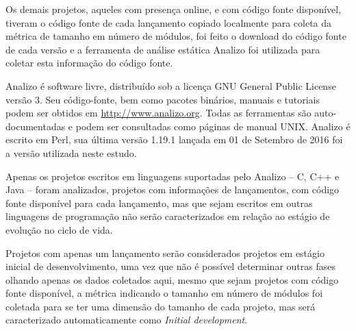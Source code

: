 
Os demais projetos, aqueles com presença online, e com código fonte disponível,
tiveram o código fonte de cada lançamento copiado localmente para coleta da
métrica de tamanho em número de módulos, foi feito o download do código fonte
de cada versão e a ferramenta de análise estática Analizo foi utilizada para
coletar esta informação do código fonte.

Analizo é software livre, distribuído sob a licença GNU General Public License
versão 3. Seu código-fonte, bem como pacotes binários, manuais e tutoriais
podem ser obtidos em \url{http://www.analizo.org}. Todas as ferramentas são
auto-documentadas e podem ser consultadas como páginas de manual UNIX.  Analizo
é escrito em Perl, sua última versão 1.19.1 lançada em 01 de Setembro de 2016
foi a versão utilizada neste estudo.

Apenas os projetos escritos em linguagens suportadas pelo Analizo -- C, C++ e
Java -- foram analizados, projetos com informações de lançamentos, com código
fonte disponível para cada lançamento, mas que sejam escritos em outras
linguagens de programação não serão caracterizados em relação ao estágio de
evolução no ciclo de vida.



Projetos com apenas um lançamento serão considerados projetos em estágio inicial
de desenvolvimento, uma vez que não é possível determinar outras fases
olhando apenas os dados coletados aqui, mesmo que sejam projetos com
código fonte disponível, a métrica indicando o tamanho em número de módulos
foi coletada para se ter uma dimensão do tamanho de cada projeto, mas
será caracterizado automaticamente como {\it Initial development}.


